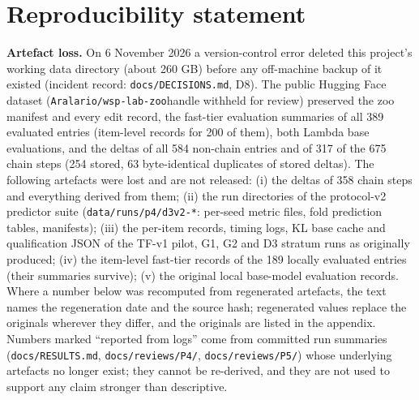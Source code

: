 \section{Reproducibility statement}
\label{sec:repro}
\textbf{Artefact loss.} On 6 November 2026 a version-control error deleted this project's working data directory (about 260 GB) before any off-machine backup of it existed (incident record: \texttt{docs/DECISIONS.md}, D8). The public Hugging Face dataset (\ifarxivpreprint\texttt{Aralario/wsp-lab-zoo}\else handle withheld for review\fi) preserved the zoo manifest and every edit record, the fast-tier evaluation summaries of all 389 evaluated entries (item-level records for 200 of them), both Lambda base evaluations, and the deltas of all 584 non-chain entries and of 317 of the 675 chain steps (254 stored, 63 byte-identical duplicates of stored deltas). The following artefacts were lost and are not released: (i) the deltas of 358 chain steps and everything derived from them; (ii) the run directories of the protocol-v2 predictor suite (\texttt{data/runs/p4/d3v2-*}: per-seed metric files, fold prediction tables, manifests); (iii) the per-item records, timing logs, KL base cache and qualification JSON of the TF-v1 pilot, G1, G2 and D3 stratum runs as originally produced; (iv) the item-level fast-tier records of the 189 locally evaluated entries (their summaries survive); (v) the original local base-model evaluation records. Where a number below was recomputed from regenerated artefacts, the text names the regeneration date and the source hash; regenerated values replace the originals wherever they differ, and the originals are listed in the appendix. Numbers marked ``reported from logs'' come from committed run summaries (\texttt{docs/RESULTS.md}, \texttt{docs/reviews/P4/}, \texttt{docs/reviews/P5/}) whose underlying artefacts no longer exist; they cannot be re-derived, and they are not used to support any claim stronger than descriptive.

